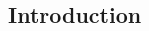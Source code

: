 \documentclass[11pt]{article}
\begin{document}
\begin{multicols}{2}





\section{Introduction}
% 
% 
% 
% 




\end{multicols}
\end{document}
